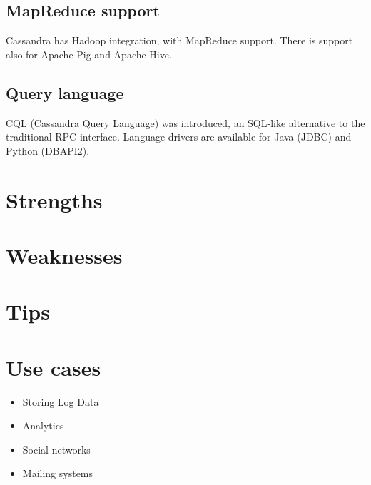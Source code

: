 \subsection{MapReduce support}

Cassandra has Hadoop integration, with MapReduce support. There is support also for Apache Pig and Apache Hive.

\subsection{Query language}

CQL (Cassandra Query Language) was introduced, an SQL-like alternative to the traditional RPC interface. Language drivers are available for Java (JDBC) and Python (DBAPI2).

\section{Strengths}

\section{Weaknesses}

\section{Tips}

\section{Use cases}

\begin{itemize}
  \item Storing Log Data
  \item Analytics
  \item Social networks
  \item Mailing systems
\end{itemize}